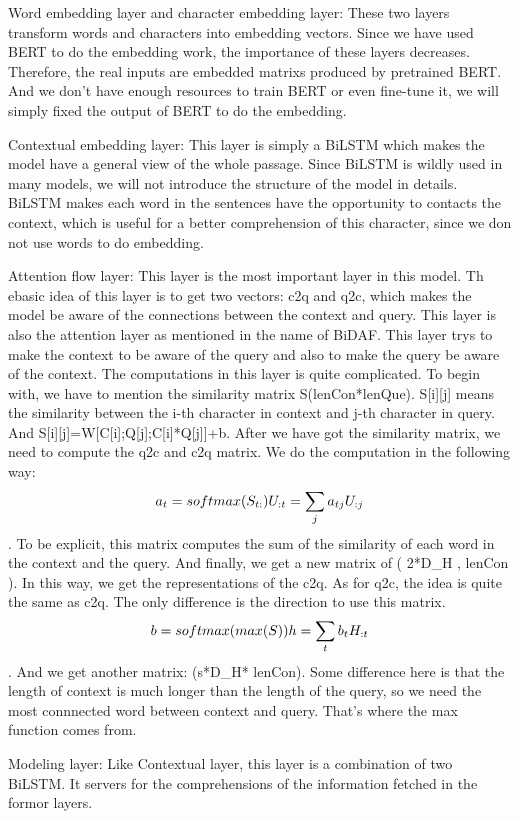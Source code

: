 \documentclass{article}
\begin{document}
Word embedding layer and character embedding layer: These two layers transform words and characters into embedding vectors. Since we have used BERT to do the embedding work, the importance of these layers decreases. Therefore, the real inputs are embedded matrixs produced by pretrained BERT. And we don't have enough resources to train BERT or even fine-tune it, we will simply fixed the output of BERT to do the embedding.

Contextual embedding layer: This layer is simply a BiLSTM which makes the model have a general view of the whole passage. Since BiLSTM is wildly used in many models, we will not introduce the structure of the model in details. BiLSTM makes each word in the sentences have the opportunity to contacts the context, which is useful for a better comprehension of this character, since we don not use words to do embedding.

Attention flow layer: This layer is the most important layer in this model. Th ebasic idea of this layer is to get two vectors: c2q and q2c, which makes the model be aware of the connections between the context and query. This layer is also the attention layer as mentioned in the name of BiDAF. This layer trys to make the context to be aware of the query and also to make the query be aware of the context. The computations in this layer is quite complicated. 
To begin with, we have to mention the similarity matrix S(lenCon*lenQue). S[i][j] means the similarity between the i-th character in context and j-th character in query. And S[i][j]=W[C[i];Q[j];C[i]*Q[j]]+b.
After we have got the similarity matrix, we need to compute the q2c and c2q matrix. We do the computation in the following way: $$a_t=softmax(S_{t:})\\U_{:t}=\sum_{j}a_{tj}U_{:j}$$. To be explicit, this matrix computes the sum of the similarity of each word in the context and the query. And finally, we get a new matrix of ( 2*D_H , lenCon ). In this way, we get the representations of the c2q.
As for q2c, the idea is quite the same as c2q. The only difference is the direction to use this matrix. $$b=softmax(max(S))\\h=\sum_tb_tH_{:t}$$. And we get another matrix: (s*D_H* lenCon). Some difference here is that the length of context is much longer than the length of the query, so we need the most connnected word between context and query. That's where the max function comes from.

Modeling layer: Like Contextual layer, this layer is a combination of two BiLSTM. It servers for the comprehensions of the information fetched in the formor layers. 
\end{document}
